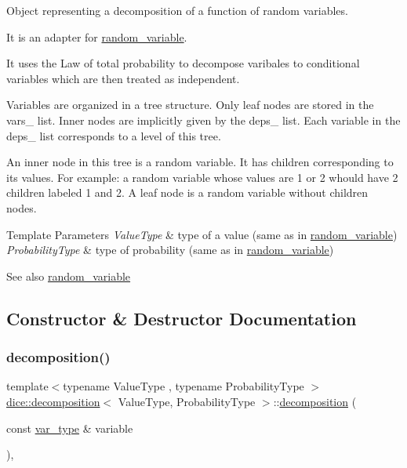 Object representing a decomposition of a function of random variables. 

It is an adapter for \mbox{\hyperlink{classdice_1_1random__variable}{random\+\_\+variable}}.

It uses the Law of total probability to decompose varibales to conditional variables which are then treated as independent.

Variables are organized in a tree structure. Only leaf nodes are stored in the vars\+\_\+ list. Inner nodes are implicitly given by the deps\+\_\+ list. Each variable in the deps\+\_\+ list corresponds to a level of this tree.

An inner node in this tree is a random variable. It has children corresponding to its values. For example\+: a random variable whose values are 1 or 2 whould have 2 children labeled 1 and 2. A leaf node is a random variable without children nodes.


\begin{DoxyTemplParams}{Template Parameters}
{\em Value\+Type} & type of a value (same as in \mbox{\hyperlink{classdice_1_1random__variable}{random\+\_\+variable}}) \\
\hline
{\em Probability\+Type} & type of probability (same as in \mbox{\hyperlink{classdice_1_1random__variable}{random\+\_\+variable}})\\
\hline
\end{DoxyTemplParams}
\begin{DoxySeeAlso}{See also}
\mbox{\hyperlink{classdice_1_1random__variable}{random\+\_\+variable}} 
\end{DoxySeeAlso}


\subsection{Constructor \& Destructor Documentation}
\mbox{\label{classdice_1_1decomposition_a0ec6a2cfb52048bd1e553d53627aec2c}} 
\subsubsection{\texorpdfstring{decomposition()}{decomposition()}\hspace{0.1cm}{\footnotesize\ttfamily [1/2]}}
{\footnotesize\ttfamily template$<$typename Value\+Type , typename Probability\+Type $>$ \\
\mbox{\hyperlink{classdice_1_1decomposition}{dice\+::decomposition}}$<$ Value\+Type, Probability\+Type $>$\+::\mbox{\hyperlink{classdice_1_1decomposition}{decomposition}} (\begin{DoxyParamCaption}\item[{const \mbox{\hyperlink{classdice_1_1random__variable}{var\+\_\+type}} \&}]{variable }\end{DoxyParamCaption})\hspace{0.3cm}{\ttfamily [inline]}, {\ttfamily [explicit]}}



